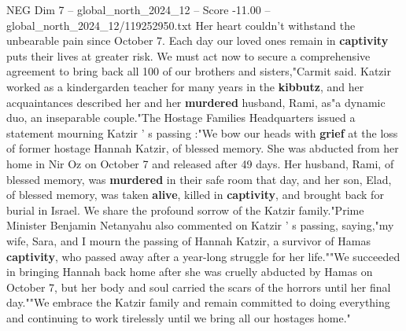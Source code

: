 \begin{textsample}{NEG Dim 7 – global\_north\_2024\_12 – Score -11.00 – global\_north\_2024\_12/119252950.txt}
Her heart couldn't withstand the unbearable pain since October 7.
Each day our loved ones remain in \textbf{captivity} puts their lives at greater risk.
We must act now to secure a comprehensive agreement to bring back all 100 of our brothers and sisters,"Carmit said.
Katzir worked as a kindergarden teacher for many years in the \textbf{kibbutz}, and her acquaintances described her and her \textbf{murdered} husband, Rami, as"a dynamic duo, an inseparable couple."The Hostage Families Headquarters issued a statement mourning Katzir ' s passing :"We bow our heads with \textbf{grief} at the loss of former hostage Hannah Katzir, of blessed memory.
She was abducted from her home in Nir Oz on October 7 and released after 49 days.
Her husband, Rami, of blessed memory, was \textbf{murdered} in their safe room that day, and her son, Elad, of blessed memory, was taken \textbf{alive}, killed in \textbf{captivity}, and brought back for burial in Israel.
We share the profound sorrow of the Katzir family."Prime Minister Benjamin Netanyahu also commented on Katzir ' s passing, saying,"my wife, Sara, and I mourn the passing of Hannah Katzir, a survivor of Hamas \textbf{captivity}, who passed away after a year-long struggle for her life.""We succeeded in bringing Hannah back home after she was cruelly abducted by Hamas on October 7, but her body and soul carried the scars of the horrors until her final day.""We embrace the Katzir family and remain committed to doing everything and continuing to work tirelessly until we bring all our hostages home."

\end{textsample}
